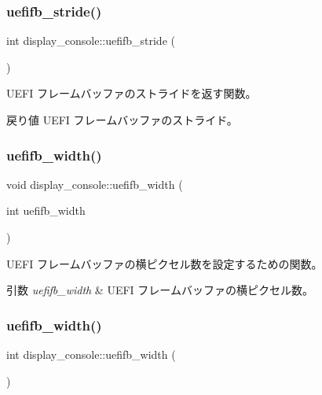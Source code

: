 \subsubsection{\texorpdfstring{uefifb\+\_\+stride()}{uefifb\_stride()}\hspace{0.1cm}{\footnotesize\ttfamily [2/2]}}
{\footnotesize\ttfamily int display\+\_\+console\+::uefifb\+\_\+stride (\begin{DoxyParamCaption}{ }\end{DoxyParamCaption})}

U\+E\+FI フレームバッファのストライドを返す関数。 \begin{DoxyReturn}{戻り値}
U\+E\+FI フレームバッファのストライド。 
\end{DoxyReturn}
\hypertarget{classdisplay__console_af3e64f62827bab683e73c8c2937bd061}{}\label{classdisplay__console_af3e64f62827bab683e73c8c2937bd061} 
\subsubsection{\texorpdfstring{uefifb\+\_\+width()}{uefifb\_width()}\hspace{0.1cm}{\footnotesize\ttfamily [1/2]}}
{\footnotesize\ttfamily void display\+\_\+console\+::uefifb\+\_\+width (\begin{DoxyParamCaption}\item[{int}]{uefifb\+\_\+width }\end{DoxyParamCaption})}

U\+E\+FI フレームバッファの横ピクセル数を設定するための関数。 
\begin{DoxyParams}{引数}
{\em uefifb\+\_\+width} & U\+E\+FI フレームバッファの横ピクセル数。 \\
\hline
\end{DoxyParams}
\hypertarget{classdisplay__console_a9842b9adc744d7be6cb4beebc357ded4}{}\label{classdisplay__console_a9842b9adc744d7be6cb4beebc357ded4} 
\subsubsection{\texorpdfstring{uefifb\+\_\+width()}{uefifb\_width()}\hspace{0.1cm}{\footnotesize\ttfamily [2/2]}}
{\footnotesize\ttfamily int display\+\_\+console\+::uefifb\+\_\+width (\begin{DoxyParamCaption}{ }\end{DoxyParamCaption})}

